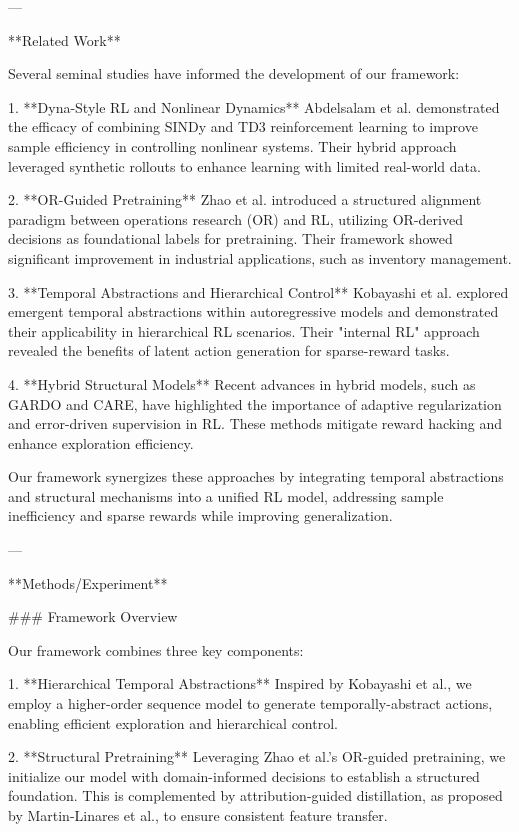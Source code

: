 ---

**Related Work**

Several seminal studies have informed the development of our framework:

1. **Dyna-Style RL and Nonlinear Dynamics**  
   Abdelsalam et al. demonstrated the efficacy of combining SINDy and TD3 reinforcement learning to improve sample efficiency in controlling nonlinear systems. Their hybrid approach leveraged synthetic rollouts to enhance learning with limited real-world data.

2. **OR-Guided Pretraining**  
   Zhao et al. introduced a structured alignment paradigm between operations research (OR) and RL, utilizing OR-derived decisions as foundational labels for pretraining. Their framework showed significant improvement in industrial applications, such as inventory management.

3. **Temporal Abstractions and Hierarchical Control**  
   Kobayashi et al. explored emergent temporal abstractions within autoregressive models and demonstrated their applicability in hierarchical RL scenarios. Their "internal RL" approach revealed the benefits of latent action generation for sparse-reward tasks.

4. **Hybrid Structural Models**  
   Recent advances in hybrid models, such as GARDO and CARE, have highlighted the importance of adaptive regularization and error-driven supervision in RL. These methods mitigate reward hacking and enhance exploration efficiency.

Our framework synergizes these approaches by integrating temporal abstractions and structural mechanisms into a unified RL model, addressing sample inefficiency and sparse rewards while improving generalization.

---

**Methods/Experiment**

### Framework Overview

Our framework combines three key components:

1. **Hierarchical Temporal Abstractions**  
   Inspired by Kobayashi et al., we employ a higher-order sequence model to generate temporally-abstract actions, enabling efficient exploration and hierarchical control.

2. **Structural Pretraining**  
   Leveraging Zhao et al.’s OR-guided pretraining, we initialize our model with domain-informed decisions to establish a structured foundation. This is complemented by attribution-guided distillation, as proposed by Martin-Linares et al., to ensure consistent feature transfer.

